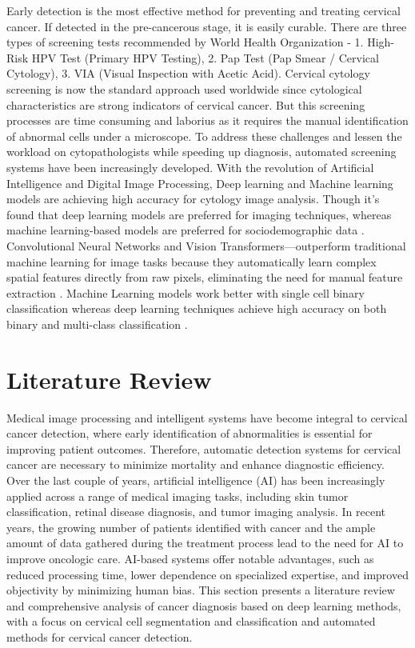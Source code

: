 \documentclass[pdflatex,sn-nature]{sn-jnl}%
\theoremstyle{thmstyleone}%
\theoremstyle{thmstyletwo}%
\theoremstyle{thmstylethree}%
\begin{document}
Early detection is the most effective method for preventing and treating cervical cancer.  If detected in the pre-cancerous stage, it is easily curable. There are three types of screening tests recommended by World Health Organization - 1. High-Risk HPV Test (Primary HPV Testing), 2. Pap Test (Pap Smear / Cervical Cytology), 3. VIA (Visual Inspection with Acetic Acid). Cervical cytology screening is now the standard approach used worldwide since cytological characteristics are strong indicators of cervical cancer. But this screening processes are time consuming and laborius as it requires the manual identification of abnormal cells under a microscope. To address these challenges and lessen the workload on cytopathologists while speeding up diagnosis, automated screening systems have been increasingly developed. With the revolution of Artificial Intelligence and Digital Image Processing, Deep learning and Machine learning models are achieving high accuracy for cytology image analysis. Though it's found that deep learning models are preferred for imaging techniques, whereas machine learning-based models are preferred for sociodemographic data \cite{Intro5khare2024systematic}. Convolutional Neural Networks and Vision Transformers—outperform traditional machine learning for image tasks because they automatically learn complex spatial features directly from raw pixels, eliminating the need for manual feature extraction \cite{Intro6xiang2020novel}. Machine Learning models work better with single cell binary classification \cite{Intro7william2018review} whereas deep learning techniques achieve high accuracy on both binary and multi-class classification \cite{Intro8civit2024lightweight}.

\section{Literature Review}\label{sec2}

Medical image processing and intelligent systems have become integral to cervical cancer detection, where early identification of abnormalities is essential for improving patient outcomes. Therefore, automatic detection systems for cervical cancer are necessary to minimize mortality and enhance diagnostic efficiency. Over the last couple of years, artificial intelligence (AI) has been increasingly applied across a range of medical imaging tasks, including skin tumor classification\cite{Lite1}\cite{Lite2}, retinal disease diagnosis\cite{Lite3}, and tumor imaging analysis\cite{Lite4}. In recent years, the growing number of patients identified with cancer and the ample amount of data gathered during the treatment process lead to the need for AI to improve oncologic care\cite{Lite5}\cite{Lite6}. AI-based systems offer notable advantages, such as reduced processing time, lower dependence on specialized expertise, and improved objectivity by minimizing human bias. This section presents a literature review and comprehensive analysis of cancer diagnosis based on deep learning methods, with a focus on cervical cell segmentation and classification and automated methods for cervical cancer detection.
\end{document}
